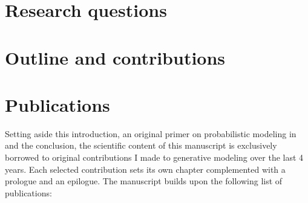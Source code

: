 \section{Research questions}


\section{Outline and contributions}

\section{Publications}
Setting aside this introduction, an original primer on probabilistic modeling in  and the conclusion,
the scientific content of this manuscript is exclusively borrowed to original contributions I made to generative modeling over the last 4 years.
Each selected contribution sets its own chapter complemented with a prologue and an epilogue.
The manuscript builds upon the following list of publications:

